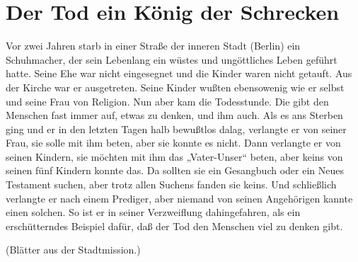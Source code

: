 \chapter{Der Tod ein König der Schrecken}

Vor zwei Jahren starb in einer Straße der inneren Stadt (Berlin) ein Schuhmacher, der sein Lebenlang ein wüstes und ungöttliches Leben geführt hatte. Seine Ehe war nicht eingesegnet und die Kinder waren nicht getauft. Aus der Kirche war er ausgetreten. Seine Kinder wußten ebensowenig wie er selbst und seine Frau von Religion. Nun aber kam die Todesstunde. Die gibt den Menschen fast immer auf, etwas zu denken, und ihm auch. Als es ans Sterben ging und er in den letzten Tagen halb bewußtlos dalag, verlangte er von seiner Frau, sie solle mit ihm beten, aber sie konnte es nicht. Dann verlangte er von seinen Kindern, sie möchten mit ihm das „Vater-Unser“ beten, aber keins von seinen fünf Kindern konnte das. Da sollten sie ein Gesangbuch oder ein Neues Testament suchen, aber trotz allen Suchens fanden sie keins. Und schließlich verlangte er nach einem Prediger, aber niemand von seinen Angehörigen kannte einen solchen. So ist er in seiner Verzweiflung dahingefahren, als ein erschütterndes Beispiel dafür, daß der Tod den Menschen viel zu denken gibt.

(Blätter aus der Stadtmission.)
